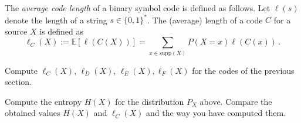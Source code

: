 \documentclass[10pt, a5paper]{scrartcl}
\newcommand{\len}{\ell}
\begin{document}
\begin{exercise}
	The \emph{average code length} of a binary symbol code is defined as follows.
	Let $\len(s)$ denote the length of a string $s \in \{0,1\}^*$. The (average) length of a code $C$ for a source $X$ is defined as
	\[
		\len_C(X) 
			:= \mathbb{E}[\len(C(X))] 
			= \sum_{x \in \mathrm{supp}(X)} P(X=x) \len(C(x)) \, .
	\]
	
	\begin{subex}
		Compute $\len_C(X)$, $\len_D(X)$, $\len_E(X), \len_F(X)$ for the codes of the previous section.	
	\end{subex}
	
	\begin{subex}
		Compute the entropy $H(X)$ for the distribution $P_X$ above.
		Compare the obtained values $H(X)$ and $\len_C(X)$ and the way you have computed them.
	\end{subex}
\end{exercise}
\end{document}
